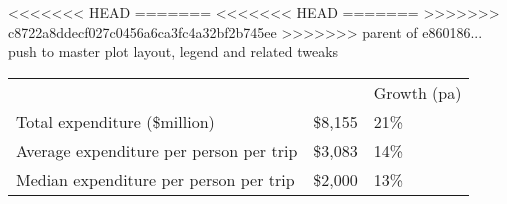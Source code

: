 <<<<<<< HEAD
=======
<<<<<<< HEAD
=======
>>>>>>> c8722a8ddecf027c0456a6ca3fc4a32bf2b745ee
>>>>>>> parent of e860186... push to master plot layout, legend and related tweaks
\begin{tabular}[t]{p{5.1cm}>{\hfill}p{1.1cm}>{\hfill}p{1.3cm}}
    &   & Growth (pa) \\ 
 Total expenditure (\$million) & \$8,155 & 21\% \\ 
  Average expenditure per person per trip & \$3,083 & 14\% \\ 
  Median expenditure per person per trip & \$2,000 & 13\% \\ 
  \end{tabular}
